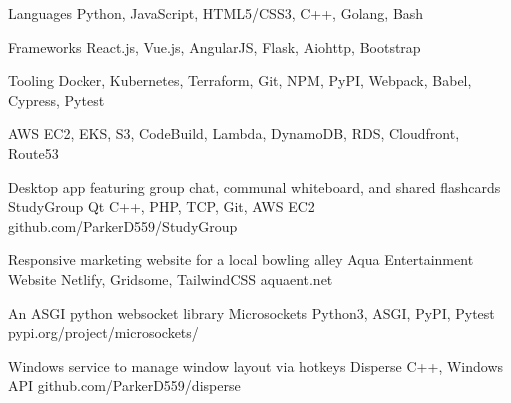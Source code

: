 \documentclass[]{awesome-cv}
\begin{document}
\vspace{-2mm}
\begin{cvskills}
	\cvskill
	{Languages}
	{Python, JavaScript, HTML5/CSS3, C++, Golang, Bash}

	\cvskill
	{Frameworks}
	{React.js, Vue.js, AngularJS, Flask, Aiohttp, Bootstrap}

	\cvskill
	{Tooling}
	{Docker, Kubernetes, Terraform, Git, NPM, PyPI, Webpack, Babel, Cypress, Pytest}

	\cvskill
	{AWS}
	{EC2, EKS, S3, CodeBuild, Lambda, DynamoDB, RDS, Cloudfront, Route53}
\end{cvskills}

\begin{cventries}
	\cventry
	{Desktop app featuring group chat, communal whiteboard, and shared flashcards}
	{StudyGroup}
	{Qt C++, PHP, TCP, Git, AWS EC2}
	{github.com/ParkerD559/StudyGroup}
	{}
	
	\vspace{-5mm}
	\cventry
	{Responsive marketing website for a local bowling alley}
	{Aqua Entertainment Website}
	{Netlify, Gridsome, TailwindCSS}
	{aquaent.net}
	{}
	
	\vspace{-5mm}
	\cventry
	{An ASGI python websocket library}
	{Microsockets}
	{Python3, ASGI, PyPI, Pytest}
	{pypi.org/project/microsockets/}
	{}
	
	\vspace{-5mm}
	\cventry
	{Windows service to manage window layout via hotkeys}
	{Disperse}
	{C++, Windows API}
	{github.com/ParkerD559/disperse}
	{}
	
	\vspace{-5mm}
\end{cventries}

\ 
\end{document}
